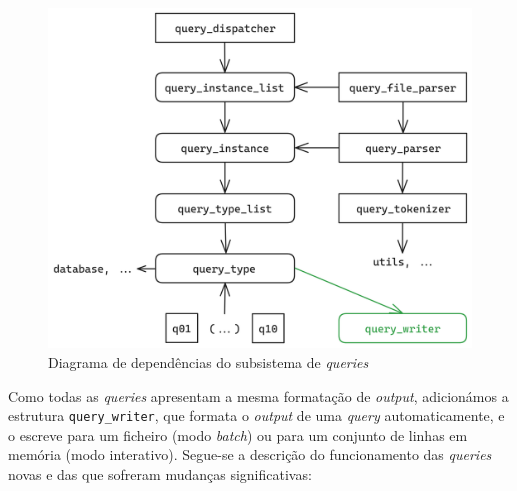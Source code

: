 \documentclass[12pt, a4paper]{article}
\begin{document}
\begin{figure}[ht]
    \centering
    \includegraphics[scale=0.17]{res-fase2/queries.png}
    \caption{Diagrama de dependências do subsistema de \emph{queries}}
    \label{fig:queries}
\end{figure}

Como todas as \emph{queries} apresentam a mesma formatação de \emph{output}, adicionámos a estrutura
\texttt{query\_writer}, que formata o \emph{output} de uma \emph{query} automaticamente, e o
escreve para um ficheiro (modo \emph{batch}) ou para um conjunto de linhas em memória (modo
interativo). Segue-se a descrição do funcionamento das \emph{queries} novas e das que sofreram
mudanças significativas:
\end{document}
